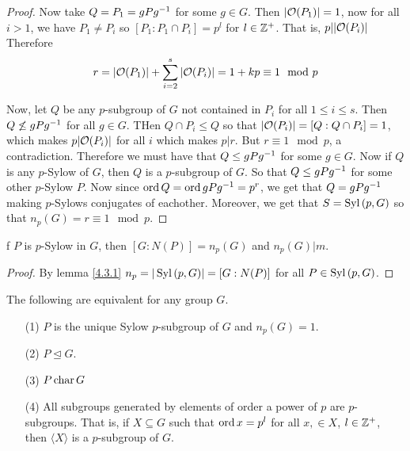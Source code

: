 \begin{proof}
     Now take $Q=P_1=gPg^{-1}$ for some $g \in G$. Then  $|\mathcal{O}(P_1)|=1$, now
     for all $i>1$, we have $P_1 \neq P_i$ so $[P_1:P_1 \cap P_i]=p^l$ for $l
     \in \mathbb{Z}^+$. That is,  $p||\mathcal{O}(P_i)|$ Therefore
     \begin{equation*}
         r=|\mathcal{O}(P_1)|+\sum_{i=2}^s{|\mathcal{O}(P_i)|}=1+kp \equiv 1 \mod{p}
     \end{equation*}

     Now, let $Q$ be any $p$-subgroup of $G$ not contained in  $P_i$ for all  $1
     \leq i \leq s$. Then  $Q \not\leq gPg^{-1}$ for all $g \in G$. THen  $Q
     \cap P_i \leq Q$ so that $|\mathcal{O}(P_i)|=[Q:Q \cap P_i]=1$, which makes
     $p|\mathcal{O}(P_i)|$ for all $i$ which makes  $p|r$. But  $r \equiv 1 \mod{p}$, a
     contradiction. Therefore we must have that $Q \leq gPg^{-1}$ for some $g
     \in G$. Now if $Q$ is any  $p$-Sylow of  $G$, then $Q$ is a $p$-subgroup of
      $G$. So that  $Q \leq gPg^{-1}$ for some other $p$-Sylow $P$. Now since
      $\operatorname{ord}{Q}=\operatorname{ord}{gPg^{-1}}=p^r$, we get that $Q=gPg^{-1}$ making $p$-Sylows
      conjugates of eachother. Moreover, we get that $S=\operatorname{Syl}{(p,G)}$ so that
      $n_p(G)=r \equiv 1 \mod{p}$.
\end{proof}
\begin{corollary}
    f $P$ is $p$-Sylow in $G$, then  $[G:N(P)]=n_p(G)$ and $n_p(G)|m$.
\end{corollary}
\begin{proof}
    By lemma \ref{4.3.1} $n_p=|\operatorname{Syl}{(p,G)}|=[G:N(P)]$ for all $P \in
    \operatorname{Syl}{(p,G)}$.
\end{proof}
\begin{corollary}
    The following are equivalent for any group $G$.
    \begin{enumerate}
        \item[(1)] $P$ is the unique Sylow  $p$-subgroup of  $G$ and
            $n_p(G)=1$.

        \item[(2)] $P \unlhd G$.

        \item[(3)] $P \operatorname{char} G$

        \item[(4)] All subgroups generated by elements of order a power of $p$
            are $p$-subgroups. That is, if $X \subseteq G$ such that
            $\operatorname{ord}{x}=p^l$ for all $x, \in X$,  $l \in \mathbb{Z}^+$, then  $\langle X
            \rangle$ is a $p$-subgroup of  $G$.
    \end{enumerate}
\end{corollary}
